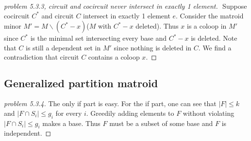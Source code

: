 \begin{proof}[problem 5.3.3, circuit and cocircuit never intersect in exactly 1 element]
    $ $
    \newline
    Suppose cocircuit $C^*$ and circuit $C$ intersect in exactly 1 element $e$. Consider the matroid minor $M'=M\backslash(C^*-x)$($M$ with $C^* -x$ deleted). Thus $x$ is a coloop in $M'$ since $C^*$ is the minimal set intersecting every base and $C^*-x$ is deleted. Note that $C$ is still a dependent set in $M'$ since nothing is deleted in $C$. We find a contradiction that circuit $C$ contains a coloop $x$.
\end{proof}
\subsection{Generalized partition matroid}

\begin{proof}[problem 5.3.4]
    The only if part is easy. For the if part, one can see that $|F|\leq k$ and $|F\cap S_i|\leq g_i$ for every $i$. Greedily adding elements to $F$ without violating $|F\cap S_i|\leq g_i$ makes a base. Thus $F$ must be a subset of some base and $F$ is independent.
\end{proof}

